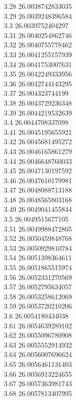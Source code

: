 {3.28	26.0038742833035\\
3.29	26.0039248396584\\
3.3	26.0039752404297\\
3.31	26.0040254862746\\
3.32	26.0040755778462\\
3.33	26.0041255157939\\
3.34	26.0041753007631\\
3.35	26.0042249333956\\
3.36	26.0042744143295\\
3.37	26.004323744199\\
3.38	26.0043729236348\\
3.39	26.0044219532639\\
3.4	26.0044708337098\\
3.41	26.0045195655921\\
3.42	26.0045681495272\\
3.43	26.0046165861279\\
3.44	26.0046648760033\\
3.45	26.0047130197592\\
3.46	26.0047610179981\\
3.47	26.0048088713188\\
3.48	26.0048565803168\\
3.49	26.0049041455844\\
3.5	26.0049515677105\\
3.51	26.0049988472805\\
3.52	26.0050459848768\\
3.53	26.0050929810784\\
3.54	26.0051398364611\\
3.55	26.0051865515974\\
3.56	26.0052331270569\\
3.57	26.0052795634057\\
3.58	26.0053258612069\\
3.59	26.0053720210206\\
3.6	26.0054180434038\\
3.61	26.0054639289102\\
3.62	26.0055096780908\\
3.63	26.0055552914932\\
3.64	26.0056007696624\\
3.65	26.0056461131403\\
3.66	26.0056913224655\\
3.67	26.0057363981743\\
3.68	26.0057813407995\\
}
